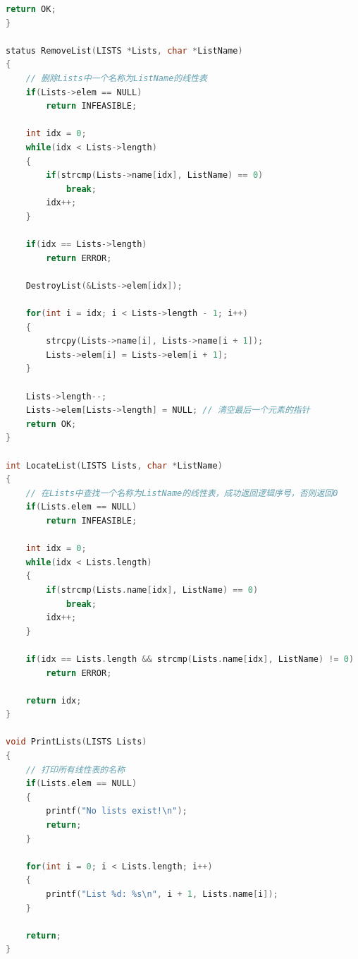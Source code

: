 \documentclass[supercite]{Experimental_Report}
\theoremstyle{definition}
\begin{document}
\begin{lstlisting}[language=C, caption={Link-Lists-Multi.h}, label=lst:link_lists_multi_h]
    return OK;
}

status RemoveList(LISTS *Lists, char *ListName)
{
    // 删除Lists中一个名称为ListName的线性表
    if(Lists->elem == NULL)
        return INFEASIBLE;
    
    int idx = 0;
    while(idx < Lists->length)
    {
        if(strcmp(Lists->name[idx], ListName) == 0)
            break;
        idx++;
    }
    
    if(idx == Lists->length)
        return ERROR;
    
    DestroyList(&Lists->elem[idx]);
    
    for(int i = idx; i < Lists->length - 1; i++)
    {
        strcpy(Lists->name[i], Lists->name[i + 1]);
        Lists->elem[i] = Lists->elem[i + 1];
    }
    
    Lists->length--;
    Lists->elem[Lists->length] = NULL; // 清空最后一个元素的指针
    return OK;
}

int LocateList(LISTS Lists, char *ListName)
{
    // 在Lists中查找一个名称为ListName的线性表，成功返回逻辑序号，否则返回0
    if(Lists.elem == NULL)
        return INFEASIBLE;
    
    int idx = 0;
    while(idx < Lists.length)
    {
        if(strcmp(Lists.name[idx], ListName) == 0)
            break;
        idx++;
    }
    
    if(idx == Lists.length && strcmp(Lists.name[idx], ListName) != 0)
        return ERROR;
    
    return idx; 
}

void PrintLists(LISTS Lists)
{
    // 打印所有线性表的名称
    if(Lists.elem == NULL)
    {
        printf("No lists exist!\n");
        return;
    }
    
    for(int i = 0; i < Lists.length; i++)
    {
        printf("List %d: %s\n", i + 1, Lists.name[i]);
    }

    return;
}
\end{lstlisting}
\end{document}
